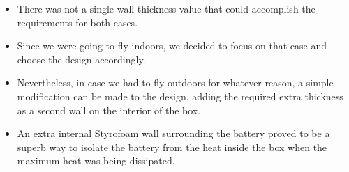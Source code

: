\begin{itemize}
\item There was not a single wall thickness value that could accomplish the requirements for both cases. 
\item Since we were going to fly indoors, we decided to focus on that case and choose the design accordingly. 
\item Nevertheless, in case we had to fly outdoors for whatever reason, a simple modification can be made to the design, adding the required extra thickness as a second wall on the interior of the box. 
\item An extra internal Styrofoam wall surrounding the battery proved to be a superb way to isolate the battery from the heat inside the box when the maximum heat was being dissipated. 
\end{itemize}
